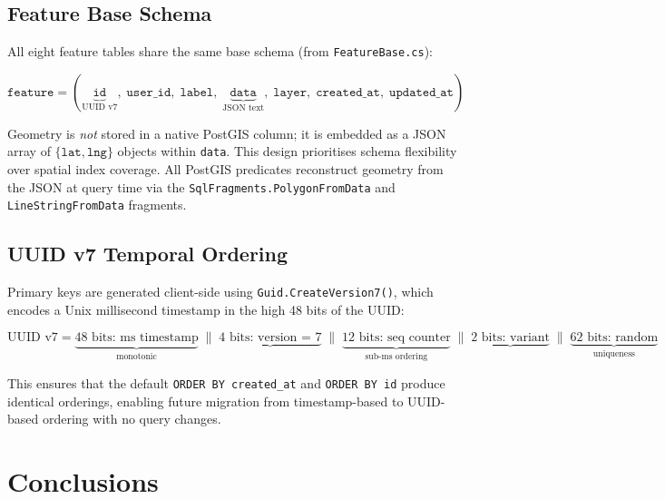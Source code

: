 \documentclass[12pt,a4paper]{article}
\theoremstyle{definition}
\theoremstyle{plain}
\theoremstyle{remark}
\begin{document}
\subsection{Feature Base Schema}

All eight feature tables share the same base schema
(from \texttt{FeatureBase.cs}):

\begin{equation}
  \texttt{feature} = (\underbrace{\texttt{id}}_{\text{UUID v7}},\;
  \texttt{user\_id},\; \texttt{label},\;
  \underbrace{\texttt{data}}_{\text{JSON text}},\;
  \texttt{layer},\; \texttt{created\_at},\; \texttt{updated\_at})
  \label{eq:feature_base}
\end{equation}

Geometry is \emph{not} stored in a native PostGIS column; it is embedded as
a JSON array of $\{\texttt{lat}, \texttt{lng}\}$ objects within \texttt{data}.
This design prioritises schema flexibility over spatial index coverage.
All PostGIS predicates reconstruct geometry from the JSON at query time via the
\texttt{SqlFragments.PolygonFromData} and \texttt{LineStringFromData} fragments.

\subsection{UUID v7 Temporal Ordering}

Primary keys are generated client-side using \texttt{Guid.CreateVersion7()},
which encodes a Unix millisecond timestamp in the high 48 bits of the UUID:

\begin{equation}
  \text{UUID v7} =
  \underbrace{\text{48 bits: ms timestamp}}_{\text{monotonic}}
  \;\|\;
  \underbrace{\text{4 bits: version = 7}}_{}
  \;\|\;
  \underbrace{\text{12 bits: seq counter}}_{\text{sub-ms ordering}}
  \;\|\;
  \underbrace{\text{2 bits: variant}}_{}
  \;\|\;
  \underbrace{\text{62 bits: random}}_{\text{uniqueness}}
  \label{eq:uuid_v7}
\end{equation}

This ensures that the default \texttt{ORDER BY created\_at} and
\texttt{ORDER BY id} produce identical orderings, enabling future migration
from timestamp-based to UUID-based ordering with no query changes.

\section{Conclusions}
\label{sec:conclusions}
\end{document}
